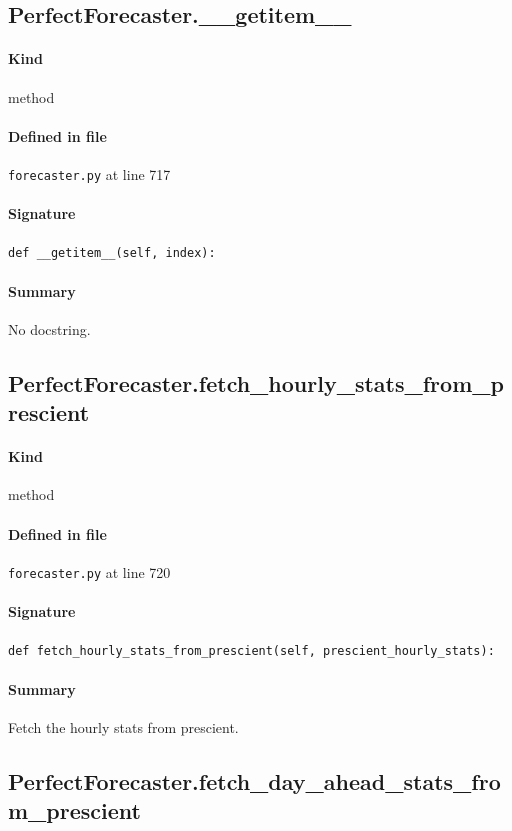 \documentclass[11pt]{report}
\begin{document}
\subsection{PerfectForecaster.\_\_getitem\_\_}
\label{def:forecaster.py:PerfectForecaster.__getitem__:L717}
\paragraph{Kind} method
\paragraph{Defined in file} \texttt{forecaster.py} at line 717
\paragraph{Signature} \texttt{def \_\_getitem\_\_(self, index):}
\paragraph{Summary} No docstring.
\subsection{PerfectForecaster.fetch\_hourly\_stats\_from\_prescient}
\label{def:forecaster.py:PerfectForecaster.fetch_hourly_stats_from_prescient:L720}
\paragraph{Kind} method
\paragraph{Defined in file} \texttt{forecaster.py} at line 720
\paragraph{Signature} \texttt{def fetch\_hourly\_stats\_from\_prescient(self, prescient\_hourly\_stats):}
\paragraph{Summary} Fetch the hourly stats from prescient.
\subsection{PerfectForecaster.fetch\_day\_ahead\_stats\_from\_prescient}
\label{def:forecaster.py:PerfectForecaster.fetch_day_ahead_stats_from_prescient:L727}
\end{document}
